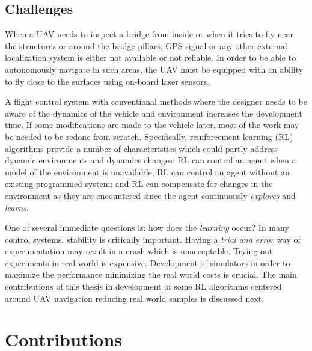 \documentclass[12pt]{report}
\begin{document}
\subsection{Challenges}
When a UAV needs to inspect a bridge from inside or when it tries to fly near the structures or around the bridge pillars, GPS signal or any other external localization system is either not available or not reliable. In order to be able to autonomously navigate in such areas, the UAV must be equipped with an ability to fly close to the surfaces using on-board laser sensors.\par
A flight control system with conventional methods where the designer needs to be aware of the dynamics of the vehicle and environment increases the development time. If some modifications are made to the vehicle later, most of the work may be needed to be redone from scratch. Specifically, reinforcement learning (RL) algorithms provide a number of characteristics which
could partly address dynamic environments and dynamics changes: RL can control
an agent when a model of the environment is unavailable; RL can control an agent without an
existing programmed system; and RL can compensate for changes in the environment
as they are encountered since the agent continuously \textit{explores} and \textit{learns}.

One of several immediate questions is: how does the \textit{learning} occur? In many control systems, stability is critically important. Having a \textit{trial and error} way of experimentation may result in a crash which is unacceptable. Trying out experiments in real world is expensive. Development of simulators in order to maximize the performance minimizing the real world costs is crucial. The main contributions of this thesis in development of some RL algorithms centered around UAV navigation reducing real world samples is discussed next.

\section{Contributions}
\end{document}
